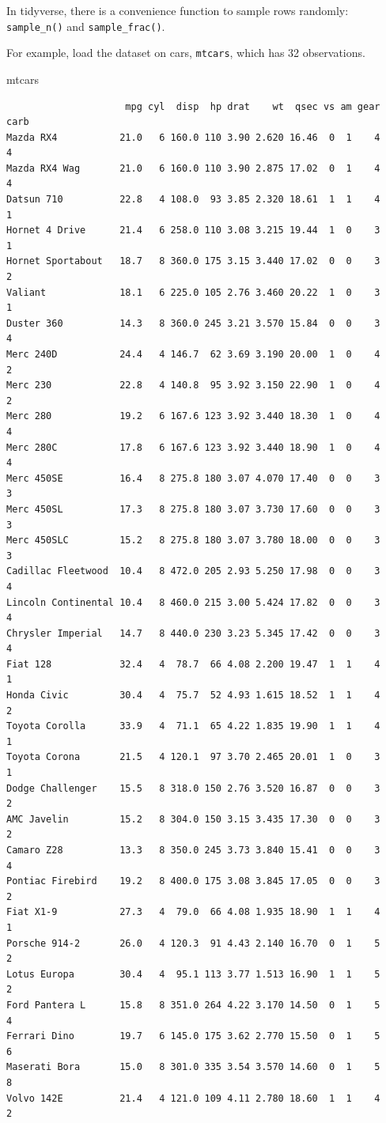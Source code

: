 \documentclass[
  letterpaper,
]{book}
\newenvironment{Shaded}{\begin{snugshade}}{\end{snugshade}}
\newcommand{\NormalTok}[1]{\textcolor[rgb]{0.00,0.23,0.31}{#1}}
\theoremstyle{definition}
\theoremstyle{definition}
\theoremstyle{plain}
\theoremstyle{definition}
\theoremstyle{plain}
\theoremstyle{plain}
\theoremstyle{remark}
\begin{document}
In tidyverse, there is a convenience function to sample rows randomly:
\texttt{sample\_n()} and \texttt{sample\_frac()}.

For example, load the dataset on cars, \texttt{mtcars}, which has 32
observations.

\begin{Shaded}
\begin{Highlighting}[]
\NormalTok{mtcars}
\end{Highlighting}
\end{Shaded}

\begin{verbatim}
                     mpg cyl  disp  hp drat    wt  qsec vs am gear carb
Mazda RX4           21.0   6 160.0 110 3.90 2.620 16.46  0  1    4    4
Mazda RX4 Wag       21.0   6 160.0 110 3.90 2.875 17.02  0  1    4    4
Datsun 710          22.8   4 108.0  93 3.85 2.320 18.61  1  1    4    1
Hornet 4 Drive      21.4   6 258.0 110 3.08 3.215 19.44  1  0    3    1
Hornet Sportabout   18.7   8 360.0 175 3.15 3.440 17.02  0  0    3    2
Valiant             18.1   6 225.0 105 2.76 3.460 20.22  1  0    3    1
Duster 360          14.3   8 360.0 245 3.21 3.570 15.84  0  0    3    4
Merc 240D           24.4   4 146.7  62 3.69 3.190 20.00  1  0    4    2
Merc 230            22.8   4 140.8  95 3.92 3.150 22.90  1  0    4    2
Merc 280            19.2   6 167.6 123 3.92 3.440 18.30  1  0    4    4
Merc 280C           17.8   6 167.6 123 3.92 3.440 18.90  1  0    4    4
Merc 450SE          16.4   8 275.8 180 3.07 4.070 17.40  0  0    3    3
Merc 450SL          17.3   8 275.8 180 3.07 3.730 17.60  0  0    3    3
Merc 450SLC         15.2   8 275.8 180 3.07 3.780 18.00  0  0    3    3
Cadillac Fleetwood  10.4   8 472.0 205 2.93 5.250 17.98  0  0    3    4
Lincoln Continental 10.4   8 460.0 215 3.00 5.424 17.82  0  0    3    4
Chrysler Imperial   14.7   8 440.0 230 3.23 5.345 17.42  0  0    3    4
Fiat 128            32.4   4  78.7  66 4.08 2.200 19.47  1  1    4    1
Honda Civic         30.4   4  75.7  52 4.93 1.615 18.52  1  1    4    2
Toyota Corolla      33.9   4  71.1  65 4.22 1.835 19.90  1  1    4    1
Toyota Corona       21.5   4 120.1  97 3.70 2.465 20.01  1  0    3    1
Dodge Challenger    15.5   8 318.0 150 2.76 3.520 16.87  0  0    3    2
AMC Javelin         15.2   8 304.0 150 3.15 3.435 17.30  0  0    3    2
Camaro Z28          13.3   8 350.0 245 3.73 3.840 15.41  0  0    3    4
Pontiac Firebird    19.2   8 400.0 175 3.08 3.845 17.05  0  0    3    2
Fiat X1-9           27.3   4  79.0  66 4.08 1.935 18.90  1  1    4    1
Porsche 914-2       26.0   4 120.3  91 4.43 2.140 16.70  0  1    5    2
Lotus Europa        30.4   4  95.1 113 3.77 1.513 16.90  1  1    5    2
Ford Pantera L      15.8   8 351.0 264 4.22 3.170 14.50  0  1    5    4
Ferrari Dino        19.7   6 145.0 175 3.62 2.770 15.50  0  1    5    6
Maserati Bora       15.0   8 301.0 335 3.54 3.570 14.60  0  1    5    8
Volvo 142E          21.4   4 121.0 109 4.11 2.780 18.60  1  1    4    2
\end{verbatim}
\end{document}
